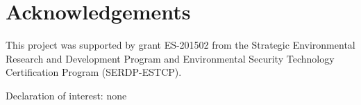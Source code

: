 \documentclass[preprint,12pt]{elsarticle}
\begin{document}


\newpage



\section*{Acknowledgements}
This project was supported by grant ES-201502 from the Strategic Environmental Research and Development Program and Environmental Security Technology Certification Program (SERDP-ESTCP).\par

Declaration of interest: none

\clearpage




\end{document}
